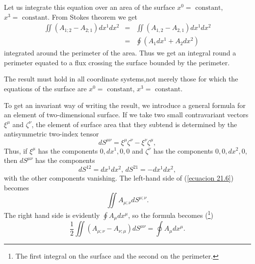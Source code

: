 Let us integrate this equation over an area of the surface $x^0 = \mbox{ constant}$, $x^3 = \mbox{ constant}$. From 
Stokes theorem we get 
\begin{equation}
 \label{ecuacion 21.6}
 \begin{array}{rcl}
  \iint{\left( A_{1;2} - A_{2;1}\right)dx^1 dx^2} & = & \iint{\left( A_{1,2} - A_{2,1}\right)dx^1 dx^2}\\
  & = & \oint{ \left( A_1 dx^1 + A_2 dx^2 \right)}
 \end{array}
\end{equation}
integrated around the perimeter of the area. Thus we get an integral round a perimeter equated to a flux crossing the 
surface bounded by the perimeter.

The result must hold in all coordinate systems,not merely those for which the equations of the surface are  $x^0 = 
\mbox{ constant}$, $x^3 = \mbox{ constant}$.

To get an invariant way of writing the result, we introduce a general formula for an element of two-dimensional 
surface. If we take two small contravariant vectors $\xi^\mu$ and $\zeta^\nu$, the element of surface area that they 
subtend is determined by the antisymmetric two-index tensor
\[
 d S^{\mu\nu} = \xi^\mu \zeta^\nu - \xi^\nu \zeta^\mu,
\]
Thus, if $\xi^\mu$ has the components $0,dx^1,0,0$ and $\zeta^\nu$ has the components $0,0,dx^2,0$, then $dS^{\mu\nu}$ 
has the components
\[
 dS^{12} = dx^1 dx^2, \, dS^{21} = - dx^1 dx^2,
\]
with the other components vanishing. The left-hand side of (\ref{ecuacion 21.6}) becomes
\[
 \iint{A_{\mu;\nu}dS^{\mu;\nu}}.
\]
The right hand side is evidently $\oint{A_\mu dx^\mu}$, so the formula becomes (\footnote{The first integral on the 
surface and the second on the perimeter.})
\begin{equation}
 \label{ecuacion 21.7}
 \frac{1}{2} \iint{\left(A_{\mu;\nu} - A_{\nu;\mu}\right)dS^{\mu\nu}} = \oint A_\mu dx^\mu.
\end{equation}
